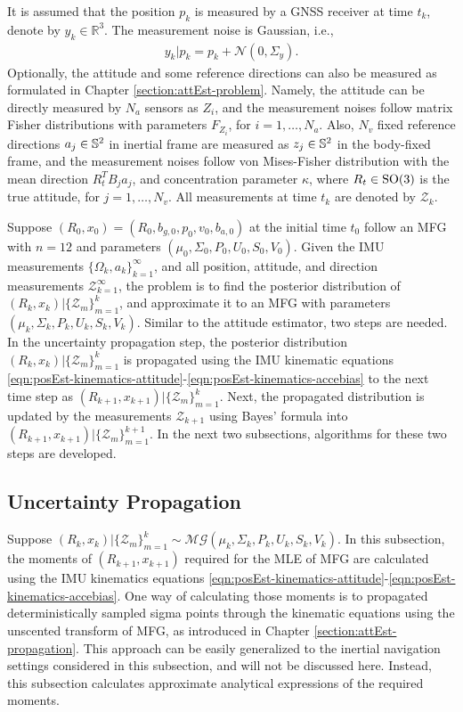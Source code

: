 It is assumed that the position $p_k$ is measured by a GNSS receiver at time $t_k$, denote by $y_k\in\mathbb{R}^3$.
The measurement noise is Gaussian, i.e.,
\begin{align}
	y_k|p_k = p_k + \mathcal{N}(0,\Sigma_y).
\end{align}
Optionally, the attitude and some reference directions can also be measured as formulated in Chapter \ref{section:attEst-problem}.
Namely, the attitude can be directly measured by $N_a$ sensors as $Z_i$, and the measurement noises follow matrix Fisher distributions with parameters $F_{Z_i}$, for $i=1,\ldots,N_a$.
Also, $N_v$ fixed reference directions $a_j\in\mathbb{S}^2$ in inertial frame are measured as $z_j\in\mathbb{S}^2$ in the body-fixed frame, and the measurement noises follow von Mises-Fisher distribution with the mean direction $R_t^TB_ja_j$, and concentration parameter $\kappa$, where $R_t\in\mathrm{SO}(3)$ is the true attitude, for $j = 1,\ldots,N_v$.
All measurements at time $t_k$ are denoted by $\mathcal{Z}_k$.

Suppose $(R_0,x_0) = (R_0,b_{g,0},p_0,v_0,b_{a,0})$ at the initial time $t_0$ follow an MFG with $n=12$ and parameters $(\mu_0,\Sigma_0,P_0,U_0,S_0,V_0)$.
Given the IMU measurements $\{\Omega_k,a_k\}_{k=1}^\infty$, and all position, attitude, and direction measurements $\mathcal{Z}_{k=1}^\infty$, the problem is to find the posterior distribution of $(R_k,x_k) | \{\mathcal{Z}_m\}_{m=1}^k$, and approximate it to an MFG with parameters $(\mu_k, \Sigma_k, P_k, U_k, S_k, V_k)$.
Similar to the attitude estimator, two steps are needed.
In the uncertainty propagation step, the posterior distribution $(R_k,x_k) | \{\mathcal{Z}_m\}_{m=1}^k$ is propagated using the IMU kinematic equations \eqref{eqn:posEst-kinematics-attitude}-\eqref{eqn:posEst-kinematics-accebias} to the next time step as $(R_{k+1},x_{k+1}) | \{\mathcal{Z}_m\}_{m=1}^k$.
Next, the propagated distribution is updated by the measurements $\mathcal{Z}_{k+1}$ using Bayes' formula into $(R_{k+1},x_{k+1}) | \{\mathcal{Z}_m\}_{m=1}^{k+1}$.
In the next two subsections, algorithms for these two steps are developed.

\subsection{Uncertainty Propagation} \label{section:posEst-propagation}

Suppose $(R_k,x_k) | \{\mathcal{Z}_m\}_{m=1}^k \sim \mathcal{MG}(\mu_k, \Sigma_k, P_k, U_k, S_k, V_k)$.
In this subsection, the moments of $(R_{k+1},x_{k+1})$ required for the MLE of MFG are calculated using the IMU kinematics equations \eqref{eqn:posEst-kinematics-attitude}-\eqref{eqn:posEst-kinematics-accebias}.
One way of calculating those moments is to propagated deterministically sampled sigma points through the kinematic equations using the unscented transform of MFG, as introduced in Chapter \ref{section:attEst-propagation}.
This approach can be easily generalized to the inertial navigation settings considered in this subsection, and will not be discussed here.
Instead, this subsection calculates approximate analytical expressions of the required moments.

